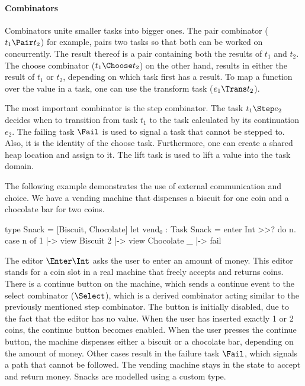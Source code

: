 \paragraph{Combinators}

Combinators unite smaller tasks into bigger ones.
The pair combinator ($t_1 \Pair t_2$) for example,
pairs two tasks so that both can be worked on concurrently.
The result thereof is a pair containing both the results of $t_1$ and $t_2$.
The choose combinator ($t_1 \Choose t_2$) on the other hand,
results in either the result of $t_1$ or $t_2$,
depending on which task first has a result.
To map a function over the value in a task,
one can use the transform task ($e_1 \Trans t_2$).

The most important combinator is the step combinator.
The task $t_1 \Step e_2$ decides when to transition from task $t_1$
to the task calculated by its continuation $e_2$.
The failing task $\Fail$ is used to signal a task that cannot be stepped to.
Also, it is the identity of the choose task.
Furthermore, one can create a shared heap location and assign to it.
The lift task is used to lift a value into the task domain.


\begin{example}
  \label{exm:vending-base}
  The following example demonstrates the use of external communication and choice.
  We have a vending machine that dispenses a biscuit for one coin and a chocolate bar for two coins.
  \begin{TASK}
    type Snack = [Biscuit, Chocolate]
    let vend$_0$ : Task Snack = enter Int >>? do n.
      case n of
        1 |-> view Biscuit
        2 |-> view Chocolate
        _ |-> fail
  \end{TASK}
  The editor $\Enter \Int$ asks the user to enter an amount of money.
  This editor stands for a coin slot in a real machine that freely accepts and returns coins.
  There is a continue button on the machine, which sends a continue event to the select combinator ($\Select$),
  which is a derived combinator acting similar to the previously mentioned step combinator.
  The button is initially disabled, due to the fact that the editor has no value.
  When the user has inserted exactly 1 or 2 coins, the continue button becomes enabled.
  When the user presses the continue button, the machine dispenses either a biscuit or a chocolate bar, depending on the amount of money.
  Other cases result in the failure task $\Fail$, which signals a path that cannot be followed.
  The vending machine stays in the state to accept and return money.
  Snacks are modelled using a custom type.
\end{example}


